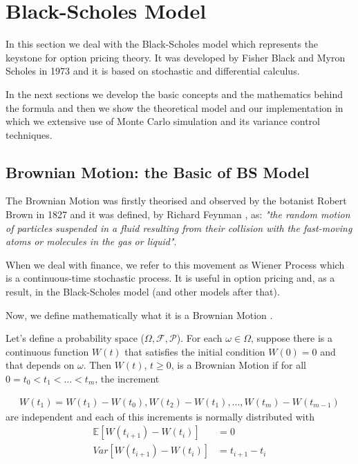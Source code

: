 \documentclass[paper=a4, fontsize=12pt]{scrartcl} %
\numberwithin{equation}{section}
\begin{document}
\tableofcontents
\section{Black-Scholes Model}
In this section we deal with the Black-Scholes model which represents the keystone for option pricing theory. It was developed by Fisher Black and Myron Scholes in 1973 and it is based on stochastic and differential calculus. \par
In the next sections we develop the basic concepts and the mathematics behind the formula and then we show the theoretical model and our implementation in which we extensive use of Monte Carlo simulation and its variance control techniques. \par

\subsection{Brownian Motion: the Basic of BS Model}
The Brownian Motion was firstly theorised and observed by the botanist Robert Brown in 1827 and it was defined, by Richard Feynman \cite{feynman}, as: \textit{"the random motion of particles suspended in a fluid resulting from their collision with the fast-moving atoms or molecules in the gas or liquid"}.	\par
When we deal with finance, we refer to this movement as Wiener Process which is a continuous-time stochastic process. It is useful in option pricing and, as a result, in the Black-Scholes model (and other models after that).	\par
Now, we define mathematically what it is a Brownian Motion \cite{shreve}.	\par
Let's define a probability space ($\Omega, \mathcal{F}, \mathcal{P}$). For each $\omega  \in \Omega$, suppose there is a continuous function ${W}(t)$ that satisfies the initial condition ${W}(0) = 0$ and that depends on $\omega$. Then ${W}(t)$, $t\geq0$, is a Brownian Motion if for all $0 = t_0<t_1<...<t_m$, the increment

		\begin{equation}	
		\begin{aligned}
			{W}(t_1) = {W}(t_1)-{W}(t_0), {W}(t_2) - {W}(t_1), ... , {W}(t_m)-{W}(t_{m-1}) 
		\end{aligned}
		\end{equation}
are independent and each of this increments is normally distributed with
		\begin{equation}	
		\begin{aligned}
			\mathbb{E}[{W}(t_{i+1}) - {W}(t_i)] &= 0 \\
			Var[{W}(t_{i+1}) - {W}(t_i)] &= t_{i+1} - t_i
		\end{aligned}
		\end{equation}
\end{document}

